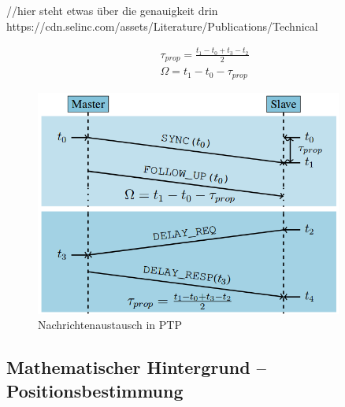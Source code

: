 //hier steht etwas über die genauigkeit drin
https://cdn.selinc.com/assets/Literature/Publications/Technical%









\begin{equation}\label{eq:formel_ptp}
\begin{split}
\tau_{prop} = \frac{t_{1} - t_{0} + t_{3} - t_{2}}{2}
\\
\Omega = t_{1} - t_{0} - \tau_{prop}
\end{split}
\end{equation}

\begin{figure}[H]
        \centering
        \includegraphics[width=0.9\textwidth]{images/ptp.png}
        \caption{Nachrichtenaustausch in PTP}
        \label{img:ptp}
\end{figure}



\subsection{Mathematischer Hintergrund -- Positionsbestimmung}

